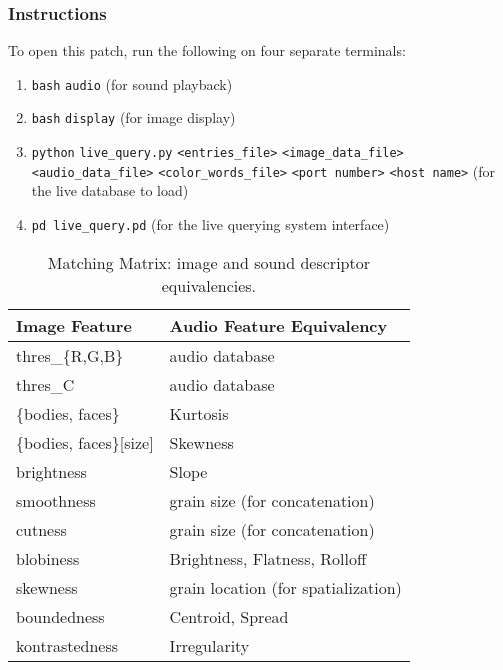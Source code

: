 \subsubsection{Instructions}

To open this patch, run the following on four separate terminals:

\begin{enumerate}
\item \texttt{bash} \texttt{audio} (for sound playback)
\item \texttt{bash} \texttt{display} (for image display)
\item \texttt{python} \texttt{live\_query.py} \texttt{<entries\_file>} \texttt{<image\_data\_file>} \texttt{<audio\_data\_file>} \texttt{<color\_words\_file>} \texttt{<port number>} \texttt{<host name>} (for the live database to load)
\item \texttt{pd live\_query.pd} (for the live querying system interface)
\end{enumerate}



\begin{table}
\begin{tabular}{l | l}
Image Feature & Audio Feature Equivalency \tabularnewline\hline

thres\_\{R,G,B\} & audio database \tabularnewline\hline

thres\_C & audio database\tabularnewline\hline

\{bodies, faces\} & Kurtosis\tabularnewline\hline

\{bodies, faces\}{[}size{]} & Skewness\tabularnewline\hline

brightness & Slope\tabularnewline\hline

smoothness & grain size (for concatenation)\tabularnewline\hline


cutness & grain size (for concatenation)\tabularnewline\hline

blobiness & Brightness, Flatness, Rolloff\tabularnewline\hline

skewness & grain location (for spatialization)\tabularnewline\hline

boundedness & Centroid, Spread\tabularnewline\hline

kontrastedness & Irregularity\tabularnewline\hline
\end{tabular}
\label{tab:matching}
\caption{Matching Matrix: image and sound descriptor equivalencies.}
\end{table}








